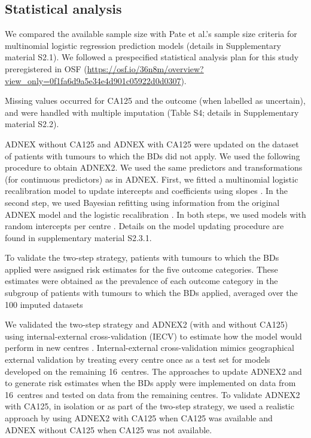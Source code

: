 \subsection{Statistical analysis}

We compared the available sample size with Pate et al.'s sample size criteria for multinomial logistic regression prediction models \cite{pateMinimumSampleSize2023} (details in Supplementary material S2.1). We followed a prespecified statistical analysis plan for this study preregistered in \gls{OSF} (\url{https://osf.io/36n8m/overview?view_only=0f1fa6d9a5e34e4d901c05922d0d0307}).

Missing values occurred for \gls{CA125} and the outcome (when labelled as uncertain), and were handled with multiple imputation (Table S4; details in Supplementary material S2.2). 

ADNEX without \gls{CA125} and ADNEX with \gls{CA125} were updated on the dataset of patients with tumours to which the \glspl{BD} did not apply. We used the following procedure to obtain ADNEX2. We used the same predictors and transformations (for continuous predictors) as in \gls{ADNEX}. First, we fitted a multinomial logistic recalibration model to update intercepts and coefficients using slopes \cite{vancalsterValidationUpdatingRisk2017}. In the second step, we used Bayesian refitting using information from the original \gls{ADNEX} model and the logistic recalibration \cite{suReviewStatisticalUpdating2018,vandeschootBayesianStatisticsModelling2021}. In both steps, we used models with random intercepts per centre \cite{wynantsDoesIgnoringClustering2018}. Details on the model updating procedure are found in supplementary material S2.3.1.

To validate the two-step strategy, patients with tumours to which the \glspl{BD} applied were assigned risk estimates for the five outcome categories. These estimates were obtained as the prevalence of each outcome category in the subgroup of patients with tumours to which the BDs applied, averaged over the 100 imputed datasets

We validated the two-step strategy and ADNEX2 (with and without \gls{CA125}) using internal-external cross-validation (IECV) to estimate how the model would perform in new centres \cite{collinsEvaluationClinicalPrediction2024, roystonConstructionValidationPrognostic2004}. Internal-external cross-validation mimics geographical external validation by treating every centre once as a test set for models developed on the remaining 16~centres. The approaches to update ADNEX2 and to generate risk estimates when the \glspl{BD} apply were implemented on data from 16~centres and tested on data from the remaining centres. To validate ADNEX2 with \gls{CA125}, in isolation or as part of the two-step strategy, we used a realistic approach by using ADNEX2 with \gls{CA125} when \gls{CA125} was available and ADNEX without \gls{CA125} when \gls{CA125} was not available.

